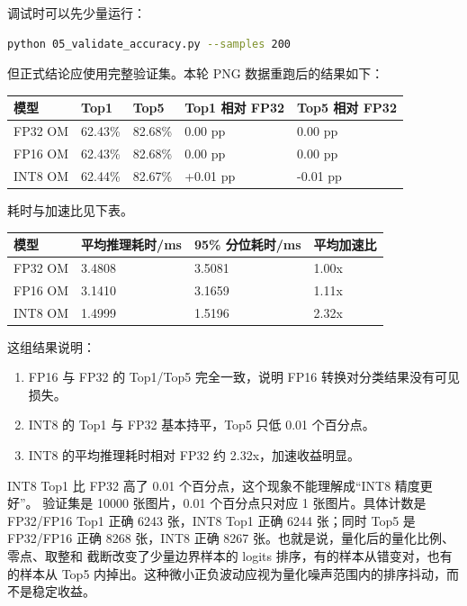 调试时可以先少量运行：

\begin{lstlisting}[language=bash]
python 05_validate_accuracy.py --samples 200
\end{lstlisting}

但正式结论应使用完整验证集。本轮 PNG 数据重跑后的结果如下：

\begin{longtable}[]{@{}lllll@{}}
\toprule\noalign{}
模型 & Top1 & Top5 & Top1 相对 FP32 & Top5 相对 FP32 \\
\midrule\noalign{}
\endhead
\bottomrule\noalign{}
\endlastfoot
FP32 OM & 62.43\% & 82.68\% & 0.00 pp & 0.00 pp \\
FP16 OM & 62.43\% & 82.68\% & 0.00 pp & 0.00 pp \\
INT8 OM & 62.44\% & 82.67\% & +0.01 pp & -0.01 pp \\
\end{longtable}

耗时与加速比见下表。

\begin{longtable}[]{@{}llll@{}}
\toprule\noalign{}
模型 & 平均推理耗时/ms & 95\% 分位耗时/ms & 平均加速比 \\
\midrule\noalign{}
\endhead
\bottomrule\noalign{}
\endlastfoot
FP32 OM & 3.4808 & 3.5081 & 1.00x \\
FP16 OM & 3.1410 & 3.1659 & 1.11x \\
INT8 OM & 1.4999 & 1.5196 & 2.32x \\
\end{longtable}

这组结果说明：

\begin{enumerate}
\def\labelenumi{\arabic{enumi}.}
\tightlist
\item
  FP16 与 FP32 的 Top1/Top5 完全一致，说明 FP16
  转换对分类结果没有可见损失。
\item
  INT8 的 Top1 与 FP32 基本持平，Top5 只低 0.01 个百分点。
\item
  INT8 的平均推理耗时相对 FP32 约 2.32x，加速收益明显。
\end{enumerate}

INT8 Top1 比 FP32 高了 0.01 个百分点，这个现象不能理解成``INT8
精度更好''。 验证集是 10000 张图片，0.01 个百分点只对应 1
张图片。具体计数是 FP32/FP16 Top1 正确 6243 张，INT8 Top1 正确 6244
张；同时 Top5 是 FP32/FP16 正确 8268 张，INT8 正确 8267
张。也就是说，量化后的量化比例、零点、取整和 截断改变了少量边界样本的
logits 排序，有的样本从错变对，也有的样本从 Top5
内掉出。这种微小正负波动应视为量化噪声范围内的排序抖动，而不是稳定收益。


